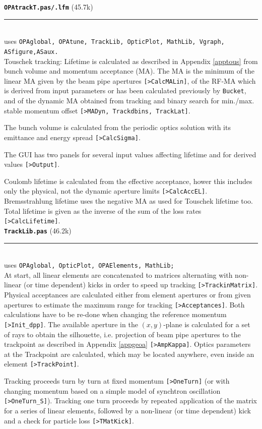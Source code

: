 \documentclass[12pt]{article}
\newcommand\code[1]{{\tt [#1]}}
\newcommand\opamodule[3]{{\bf \tt #1} #2\\  \rule[3pt]{\textwidth}{0.2pt} \\ {\scriptsize uses \tt  #3}\\[1ex]}
\begin{document}
\opamodule{OPAtrackT.pas/.lfm}{(45.7k)}{OPAglobal,  OPAtune, TrackLib, OpticPlot, MathLib, Vgraph, ASfigure,ASaux.}
Touschek tracking: Lifetime is calculated as described in Appendix \ref{apptous} from bunch volume and momentum acceptance (MA). The MA is the minimum of the linear MA given by the beam pipe apertures \code{>CalcMALin}, of the RF-MA which is derived from input parameters or has been calculated previously by {\tt Bucket}, and of the dynamic MA obtained from tracking and binary search for min./max. stable momentum offset \code{>MADyn, Trackdbins, TrackLat}.

The bunch volume is calculated from the periodic optics solution with its emittance and energy spread \code{>CalcSigma}.

The GUI has two panels for several input values affecting lifetime and for derived values \code{>Output}.

Coulomb lifetime is calculated from the effective acceptance, hower this includes only the physical, not the dynamic aperture limits \code{>CalcAccEL}. Bremsstrahlung lifetime uses the negative MA as used for Touschek lifetime too. Total lifetime is given as the inverse of the sum of the loss rates \code{>CalcLifetime}.\\

\opamodule{TrackLib.pas}{(46.2k)}{OPAglobal, OpticPlot, OPAElements, MathLib;}
At start, all linear elements are concatenated to matrices alternating with non-linear (or time dependent) kicks in order to speed up tracking \code{>TrackinMatrix}. Physical acceptances are calculated either from element apertures or from given apertures to estimate the maximum range for tracking \code{>Acceptances}. Both calculations have to be re-done when changing the reference momentum \code{>Init\_dpp}.
The available aperture in the $(x,y)$-plane is calculated for a set of rays to obtain the silhouette, i.e. projection of beam pipe apertures to the trackpoint as described in Appendix \ref{appgeoa} \code{>AmpKappa}. Optics parameters at the Trackpoint are calculated, which may be located anywhere, even inside an element \code{>TrackPoint}.

Tracking proceeds turn by turn at fixed momentum \code{>OneTurn} (or with changing momentum based on a simple model of synchtron oscillation \code{>OneTurn\_S}). Tracking one turn proceeds by repeated application of the matrix for a series of linear elements, followed by a non-linear (or time dependent) kick and a check for particle loss \code{>TMatKick}.
\end{document}
